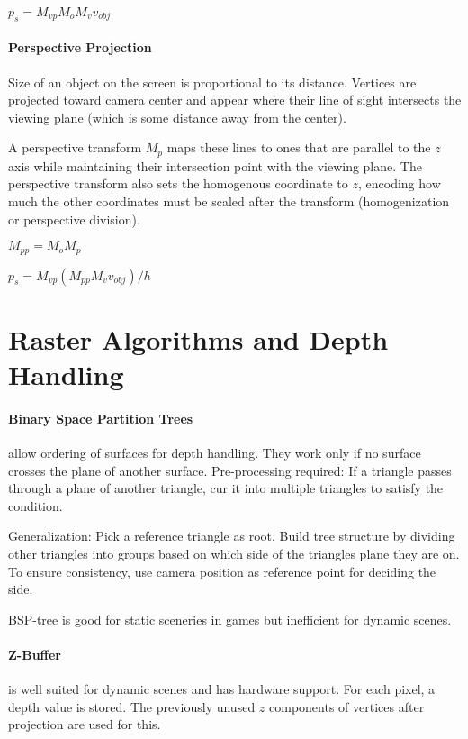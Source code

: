\documentclass{article}
\begin{document}
$p_s = M_{vp} M_o M_v v_{obj}$

\paragraph{Perspective Projection} Size of an object on the screen is proportional to its distance. Vertices are projected toward camera center and appear where their line of sight intersects the viewing plane (which is some distance away from the center).

A perspective transform $M_p$ maps these lines to ones that are parallel to the $z$ axis while maintaining their intersection point with the viewing plane. The perspective transform also sets the homogenous coordinate to $z$, encoding how much the other coordinates must be scaled after the transform (homogenization or perspective division).

$M_{pp} = M_o M_p$

$p_s = M_{vp} (M_{pp} M_v v_{obj})/h$

\section{Raster Algorithms and Depth Handling}

\paragraph{Binary Space Partition Trees} allow ordering of surfaces for depth handling. They work only if no surface crosses the plane of another surface. Pre-processing required: If a triangle passes through a plane of another triangle, cur it into multiple triangles to satisfy the condition.

Generalization: Pick a reference triangle as root. Build tree structure by dividing other triangles into groups based on which side of the triangles plane they are on. To ensure consistency, use camera position as reference point for deciding the side.

BSP-tree is good for static sceneries in games but inefficient for dynamic scenes.

\paragraph{Z-Buffer} is well suited for dynamic scenes and has hardware support. For each pixel, a depth value is stored. The previously unused $z$ components of vertices after projection are used for this.  
\end{document}
